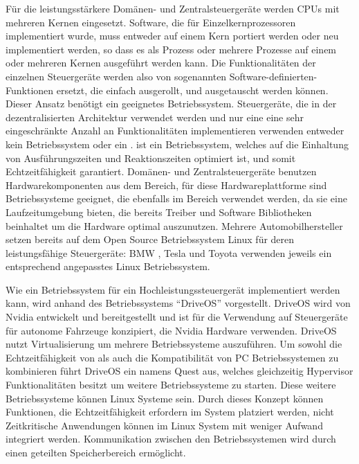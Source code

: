 Für die leistungsstärkere Domänen- und Zentralsteuergeräte werden CPUs mit mehreren Kernen eingesetzt. Software, die für Einzelkernprozessoren implementiert wurde, muss entweder auf einem Kern portiert werden oder neu implementiert werden, so dass es als Prozess oder mehrere Prozesse auf einem oder mehreren Kernen ausgeführt werden kann. \cite{Widlund2017} Die Funktionalitäten der einzelnen Steuergeräte werden also von sogenannten Software-definierten-Funktionen ersetzt, die einfach ausgerollt, und ausgetauscht werden können. Dieser Ansatz benötigt ein geeignetes Betriebssystem. Steuergeräte, die in der dezentralisierten Architektur verwendet werden und nur eine eine sehr eingeschränkte Anzahl an Funktionalitäten implementieren verwenden entweder kein Betriebssystem oder ein .  ist ein Betriebssystem, welches auf die Einhaltung von Ausführungszeiten und Reaktionszeiten optimiert ist, und somit Echtzeitfähigkeit garantiert. Domänen- und Zentralsteuergeräte benutzen Hardwarekomponenten aus dem  Bereich, für diese Hardwareplattforme sind Betriebssysteme geeignet, die ebenfalls im  Bereich verwendet werden, da sie eine Laufzeitumgebung bieten, die bereits Treiber und Software Bibliotheken beinhaltet um die Hardware optimal auszunutzen. Mehrere Automobilhersteller setzen bereits auf dem Open Source Betriebssystem Linux für deren leistungsfähige Steuergeräte: BMW \cite{Foss2019}, Tesla \cite{Tesla2024} und Toyota \cite{endgadget2017} verwenden jeweils ein entsprechend angepasstes Linux Betriebssystem.

Wie ein Betriebssystem für ein Hochleistungssteuergerät implementiert werden kann, wird anhand des Betriebssystems \enquote{DriveOS} vorgestellt. DriveOS wird von Nvidia entwickelt und bereitgestellt und ist für die Verwendung auf Steuergeräte für autonome Fahrzeuge konzipiert, die Nvidia Hardware verwenden. \cite{Nvidia2024} DriveOS nutzt Virtualisierung um mehrere Betriebssysteme auszuführen. Um sowohl die Echtzeitfähigkeit von  als auch die Kompatibilität von PC Betriebssystemen zu kombinieren führt DriveOS ein  namens Quest aus, welches gleichzeitig Hypervisor Funktionalitäten besitzt um weitere Betriebssysteme zu starten. Diese weitere Betriebssysteme können Linux Systeme sein. Durch dieses Konzept können Funktionen, die Echtzeitfähigkeit erfordern im  System platziert werden, nicht Zeitkritische Anwendungen können im Linux System mit weniger Aufwand integriert werden. Kommunikation zwischen den Betriebssystemen wird durch einen geteilten Speicherbereich ermöglicht. 
\cite{Sinha2021}

